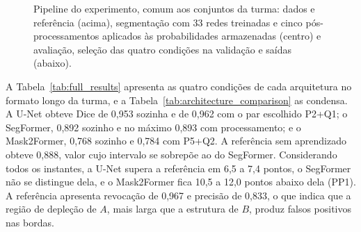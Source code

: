 \documentclass[final,5p,times,twocolumn]{elsarticle}
\begin{document}
\begin{figure}[t]
{}
\caption{Pipeline do experimento, comum aos conjuntos da turma: dados e referência (acima), segmentação com 33 redes treinadas e cinco pós-processamentos aplicados às probabilidades armazenadas (centro) e avaliação, seleção das quatro condições na validação e saídas (abaixo).}
\label{fig:overview}
\end{figure}

A Tabela~\ref{tab:full_results} apresenta as quatro condições de cada arquitetura no formato longo da turma, e a Tabela~\ref{tab:architecture_comparison} as condensa. A U-Net obteve Dice de 0,953 sozinha e de 0,962 com o par escolhido P2+Q1; o SegFormer, 0,892 sozinho e no máximo 0,893 com processamento; e o Mask2Former, 0,768 sozinho e 0,784 com P5+Q2. A referência sem aprendizado obteve 0,888, valor cujo intervalo se sobrepõe ao do SegFormer. Considerando todos os instantes, a U-Net supera a referência em 6,5 a 7,4 pontos, o SegFormer não se distingue dela, e o Mask2Former fica 10,5 a 12,0 pontos abaixo dela (PP1). A referência apresenta revocação de 0,967 e precisão de 0,833, o que indica que a região de depleção de $A$, mais larga que a estrutura de $B$, produz falsos positivos nas bordas.
\end{document}
